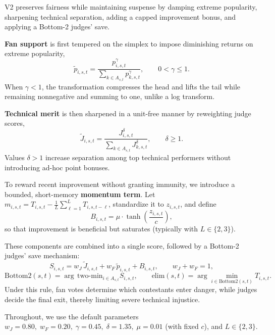 \documentclass[12pt]{article}
\begin{document}
V2 preserves fairness while maintaining suspense by damping extreme popularity, sharpening technical separation, adding a capped improvement bonus, and applying a Bottom-2 judges’ save.

\textbf{Fan support }is first tempered on the simplex to impose diminishing returns on extreme popularity,
\begin{equation}
	\tilde p_{i,s,t}=\frac{p_{i,s,t}^{\gamma}}{\sum_{k\in A_{s,t}}p_{k,s,t}^{\gamma}},\qquad 0<\gamma\le1 .
\end{equation}
When $\gamma<1$, the transformation compresses the head and lifts the tail while remaining nonnegative and summing to one, unlike a log transform.

\textbf{Technical merit} is then sharpened in a unit-free manner by reweighting judge scores,
\begin{equation}
	\tilde J_{i,s,t}=\frac{J_{i,s,t}^{\delta}}{\sum_{k\in A_{s,t}}J_{k,s,t}^{\delta}},\qquad \delta\ge1 .
\end{equation}
Values $\delta>1$ increase separation among top technical performers without introducing ad-hoc point bonuses.

To reward recent improvement without granting immunity, we introduce a bounded, short-memory \textbf{momentum term}.
Let $m_{i,s,t}=T_{i,s,t}-\frac{1}{L}\sum_{\ell=1}^{L}T_{i,s,t-\ell}$, standardize it to $z_{i,s,t}$, and define
\begin{equation}
	B_{i,s,t}=\mu\cdot \tanh\!\left(\frac{z_{i,s,t}}{c}\right),
\end{equation}
so that improvement is beneficial but saturates (typically with $L\in\{2,3\}$).

These components are combined into a single score, followed by a Bottom-2 judges’ save mechanism:
\begin{equation}
	S_{i,s,t}=w_J\,\tilde J_{i,s,t}+w_F\,\tilde p_{i,s,t}+B_{i,s,t},\qquad w_J+w_F=1,
\end{equation}
\begin{equation}
	\text{Bottom2}(s,t)=\arg\,\text{two-min}_{i\in A_{s,t}} S_{i,s,t},\qquad
	\text{elim}(s,t)=\arg\min_{i\in \text{Bottom2}(s,t)} T_{i,s,t}.
\end{equation}
Under this rule, fan votes determine which contestants enter danger, while judges decide the final exit, thereby limiting severe technical injustice.

Throughout, we use the default parameters
$w_J=0.80,\;w_F=0.20,\;\gamma=0.45,\;\delta=1.35,\;\mu=0.01$ (with fixed $c$), and $L\in\{2,3\}$.
\end{document}
